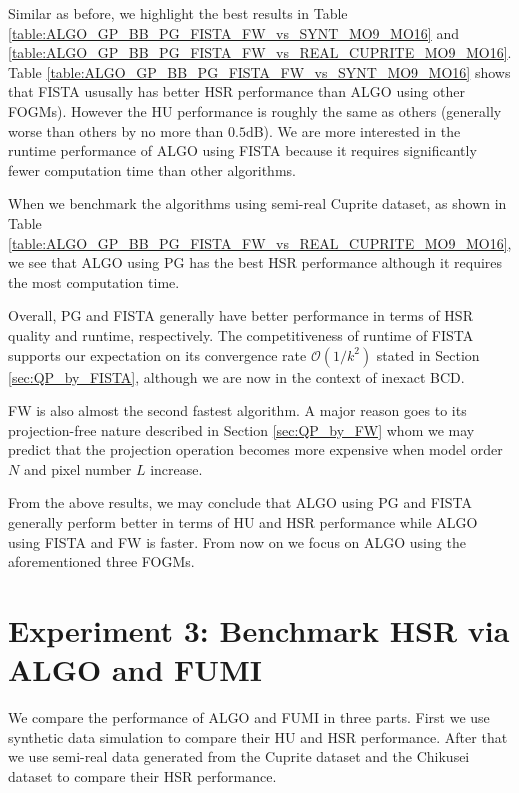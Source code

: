 Similar as before, we highlight the best results in Table
\ref{table:ALGO_GP_BB_PG_FISTA_FW_vs_SYNT_MO9_MO16} and
\ref{table:ALGO_GP_BB_PG_FISTA_FW_vs_REAL_CUPRITE_MO9_MO16}.
Table \ref{table:ALGO_GP_BB_PG_FISTA_FW_vs_SYNT_MO9_MO16} shows that FISTA
ususally has better HSR performance than ALGO using other FOGMs).
However the HU performance is roughly the same as others (generally
worse than others by no more than $0.5$dB).
We are more interested in the runtime performance of ALGO using FISTA because
it requires significantly fewer computation time than other algorithms. 

When we benchmark the algorithms using semi-real Cuprite dataset, as shown in
Table \ref{table:ALGO_GP_BB_PG_FISTA_FW_vs_REAL_CUPRITE_MO9_MO16}, we see that
ALGO using PG has the best HSR performance although it requires the most
computation time.

Overall, PG and FISTA generally have better performance in terms of HSR
quality and runtime, respectively.
The competitiveness of runtime of FISTA supports our expectation on its
convergence rate $\mathcal O(1/k^2)$ stated in Section \ref{sec:QP_by_FISTA},
although we are now in the context of inexact BCD.

FW is also almost the second fastest algorithm.
A major reason goes to its projection-free nature described in Section
\ref{sec:QP_by_FW} whom we may predict that the projection operation becomes
more expensive when model order $N$ and pixel number $L$ increase.

From the above results, we may conclude that ALGO using PG and FISTA generally
perform better in terms of HU and HSR performance while ALGO using FISTA and
FW is faster.
From now on we focus on ALGO using the aforementioned three FOGMs.

\newpage
\section{Experiment 3: Benchmark HSR via ALGO and FUMI}
We compare the performance of ALGO and FUMI in three parts.
First we use synthetic data simulation to compare their HU and HSR
performance.
After that we use semi-real data generated from the Cuprite dataset and the
Chikusei dataset to compare their HSR performance.


